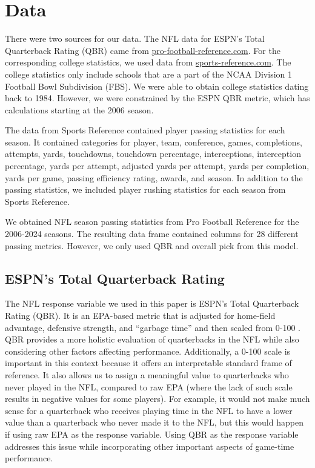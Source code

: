 \documentclass{article}
\begin{document}
\section{Data}
\label{sec:data}

There were two sources for our data. The NFL data for ESPN's Total Quarterback Rating (QBR) came from \href{https://pro-football-reference.com}{pro-football-reference.com}. For the corresponding college statistics, we used data from \href{https://sports-reference.com}{sports-reference.com}. The college statistics only include schools that are a part of the NCAA Division 1 Football Bowl Subdivision (FBS). We were able to obtain college statistics dating back to 1984. However, we were constrained by the ESPN QBR metric, which has calculations starting at the 2006 season.

The data from Sports Reference contained player passing statistics for each season. It contained categories for player, team, conference, games, completions, attempts, yards, touchdowns, touchdown percentage, interceptions, interception percentage, yards per attempt, adjusted yards per attempt, yards per completion, yards per game, passing efficiency rating, awards, and season. In addition to the passing statistics, we included player rushing statistics for each season from Sports Reference.

We obtained NFL season passing statistics from Pro Football Reference for the 2006-2024 seasons. The resulting data frame contained columns for 28 different passing metrics. However, we only used QBR and overall pick from this model.

\subsection{ESPN's Total Quarterback Rating}

The NFL response variable we used in this paper is ESPN's Total Quarterback Rating (QBR). It is an EPA-based metric that is adjusted for home-field advantage, defensive strength, and ``garbage time'' and then scaled from 0-100 \citep{noauthor_how_2016}. QBR provides a more holistic evaluation of quarterbacks in the NFL while also considering other factors affecting performance. Additionally, a 0-100 scale is important in this context because it offers an interpretable standard frame of reference. It also allows us to assign a meaningful value to quarterbacks who never played in the NFL, compared to raw EPA (where the lack of such scale results in negative values for some players). For example, it would not make much sense for a quarterback who receives playing time in the NFL to have a lower value than a quarterback who never made it to the NFL, but this would happen if using raw EPA as the response variable. Using QBR as the response variable addresses this issue while incorporating other important aspects of game-time performance.
\end{document}

